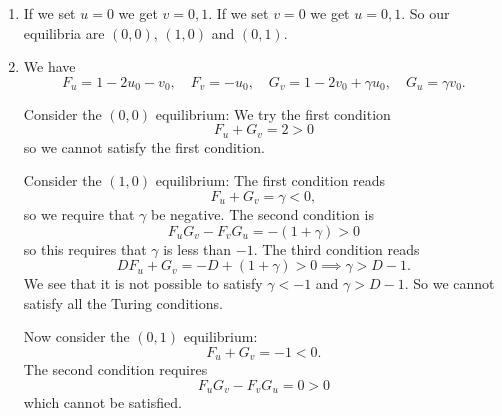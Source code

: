\documentclass[a4paper, 12pt]{article}
\begin{document}
\begin{enumerate}[label={\bf \arabic{*}.\;}, ref={\arabic{*}},itemsep=3ex, left=0ex]
{\begin{enumerate}[label=(\alph*)]
{              Finally, since the quadratic component of $k_s$ is positive we can guarantee solutions if the quadratic $\det\m{J}$ crosses the real axis, thus the discriminant of the quadratic $\det\m{J}$ must be greater than $0$, i.e.
              \begin{equation}
                \left(D F_u + G_v - v_0 F_v\right)^2 - 4D(F_uG_v- F_vG_u) >0.
              \end{equation}
            }
          \item{
              If we set $u=0$ we get $v=0,1$. If we set $v=0$ we get $u=0,1$. So our equilibria are $(0,0)$, $(1,0)$ and $(0,1)$.
            }
          \item{
              We have
              \begin{equation}
                F_u = 1-2u_0 -v_0,\quad F_v = -u_0,\quad G_v = 1-2v_0+\gamma u_0,\quad G_u = \gamma v_0.
              \end{equation}

              Consider the $(0,0)$ equilibrium: We try the first condition
              \begin{equation}
                F_u + G_v = 2 >0
              \end{equation}
              so we cannot satisfy the first condition.

              Consider the $(1,0)$ equilibrium: The first condition reads
              \begin{equation}
                F_u + G_v =\gamma  <0,
              \end{equation}
              so we require that $\gamma$ be negative. The second condition is
              \begin{equation}
                F_u G_v - F_v G_u= -(1+\gamma) >0
              \end{equation}
              so this requires that $\gamma$ is less than $-1$. The third condition reads
              \begin{equation}
                D F_u + G_v =-D + (1+\gamma) >0 \implies \gamma > D-1.
              \end{equation}
              We see that it is not possible to satisfy $\gamma<-1$ and $\gamma> D-1$. So we cannot satisfy all the Turing conditions.

              Now consider the $(0,1)$ equilibrium:
              \begin{equation}
                F_u + G_v  =-1<0.
              \end{equation}
              The second condition requires
              \begin{equation}
                F_u G_v - F_v G_u  = 0 >0
              \end{equation}
              which cannot be satisfied.

}
\end{enumerate}}
\end{enumerate}
\end{document}
